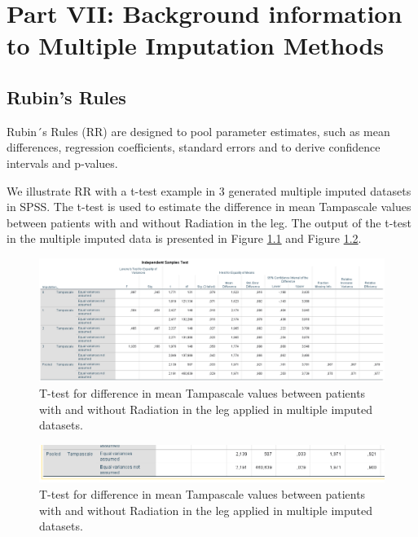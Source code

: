 \documentclass[
]{book}
\begin{document}
\hypertarget{part-part-vii-background-information-to-multiple-imputation-methods}{%
\part{Part VII: Background information to Multiple Imputation Methods}\label{part-part-vii-background-information-to-multiple-imputation-methods}}

\hypertarget{rubins-rules}{%
\chapter{Rubin's Rules}\label{rubins-rules}}

Rubin´s Rules (RR) are designed to pool parameter estimates, such as mean differences, regression coefficients, standard errors and to derive confidence intervals and p-values.

We illustrate RR with a t-test example in 3 generated multiple imputed datasets in SPSS. The t-test is used to estimate the difference in mean Tampascale values between patients with and without Radiation in the leg. The output of the t-test in the multiple imputed data is presented in Figure \ref{fig:tab9-1} and Figure \ref{fig:tab9-2}.

\begin{figure}

{\centering \includegraphics[width=0.9\linewidth]{images/table5.1} 

}

\caption{T-test for difference in mean Tampascale values between patients with and without Radiation in the leg applied in multiple imputed datasets.}\label{fig:tab9-1}
\end{figure}

\begin{figure}

{\centering \includegraphics[width=0.9\linewidth]{images/table5.1b} 

}

\caption{T-test for difference in mean Tampascale values between patients with and without Radiation in the leg applied in multiple imputed datasets.}\label{fig:tab9-2}
\end{figure}
\end{document}
